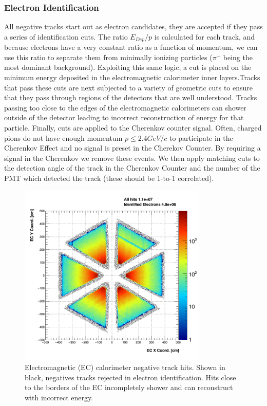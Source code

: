 \subsubsection{Electron Identification}
All negative tracks start out as electron candidates, they are accepted if they pass a series of identification cuts. The ratio $E_{Dep}/p$ is calculated for each track, and because electrons have a very constant ratio as a function of momentum, we can use this ratio to separate them from minimally ionizing particles ($\pi^{-}$ being the most dominant background).  Exploiting this same logic, a cut is placed on the minimum energy deposited in the electromagnetic calorimeter inner layers.Tracks that pass these cuts are next subjected to a variety of geometric cuts to ensure that they pass through regions of the detectors that are well understood.  Tracks passing too close to the edges of the electromagnetic calorimeters can shower outside of the detector leading to incorrect reconstruction of energy for that particle.  Finally, cuts are applied to the Cherenkov counter signal.  Often, charged pions do not have enough momentum $p \leq 2.4 GeV/c$ to participate in the Cherenkov Effect and no signal is preset in the Cherekov Counter.  By requiring a signal in the Cherenkov we remove these events.  We then apply matching cuts to the detection angle of the track in the Cherenkov Counter and the number of the PMT which detected the track (these should be 1-to-1 correlated).  

\begin{figure}
  \centering
  \includegraphics[width=9cm]{image/ECFiducial.png}
  \caption{Electromagnetic (EC) calorimeter negative track hits.  Shown in black, negatives tracks rejected in electron identification.  Hits close to the borders of the EC incompletely shower and can reconstruct with incorrect energy.}
  \label{fig:ecfid}
\end{figure}


